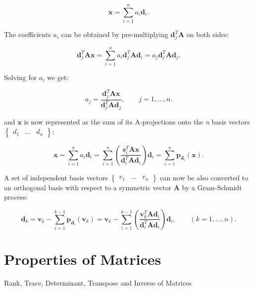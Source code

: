 \documentclass[10pt,b5paper,titlepage]{book}
\begin{document}
\begin{equation}
    \mathbf{x} = \sum_{i=1}^{n} a_{i}\mathbf{d}_{i}
.\end{equation}

The coefficients $a_{i}$ can be obtained by pre-multiplying $\mathbf{d}_{j}^{T}\mathbf{A}$
on both sides:

\begin{equation}
    \mathbf{d}_{j}^{T}\mathbf{A}\mathbf{x}
    = \sum_{i=1}^{n} a_{i}\mathbf{d}_{j}^{T}\mathbf{A}\mathbf{d}_{i}
    = a_{j}\mathbf{d}_{j}^{T}\mathbf{A}\mathbf{d}_{j}
.\end{equation}

Solving for $a_{i}$ we get:

\begin{equation}
    a_{j} = \frac{\mathbf{d}_{j}^{T}\mathbf{A}\mathbf{x}}{\mathbf{d}_{j}^{T}\mathbf{A}\mathbf{d}_{j}}
    ,\qquad j = 1,\ldots,n
.\end{equation}

and $\mathbf{x}$ is now represented as the sum of its A-projections onto the
\textit{n} basis vectors $\begin{Bmatrix} d_1 & \ldots & d_n \end{Bmatrix}$:

\begin{equation}
    \mathbf{x}
    = \sum_{i=1}^{n} a_{i}\mathbf{d}_{i}
    = \sum_{i=1}^{n} \left(
    \frac{\mathbf{s}_{i}^{T}\mathbf{A}\mathbf{x}}{\mathbf{d}_{i}^{T}\mathbf{A}\mathbf{d}_{i}}
    \right) \mathbf{d}_{i}
    = \sum_{i=1}^{n} \mathbf{p}_{\mathbf{d}_{i}}(\mathbf{x})
.\end{equation}

A set of independent basis vectors $\begin{Bmatrix} v_1 & \ldots & v_n \end{Bmatrix}$
can now be also converted to an orthogonal basis with respect to a symmetric
vector $\mathbf{A}$ by a Gram-Schmidt process:

\begin{equation}
    \mathbf{d}_{k} = \mathbf{v}_{k}
    - \sum_{i=1}^{k-1} \mathbf{p}_{\mathbf{d}_{i}}(\mathbf{v}_{k})
    = \mathbf{v}_{k}
    - \sum_{i=1}^{k-1} \left(
    \frac{\mathbf{v}_{k}^{T}\mathbf{A}\mathbf{d}_{i}}
    {\mathbf{d}_{i}^{T}\mathbf{A}\mathbf{d}_{i}} \right) \mathbf{d}_{i}
    , \qquad (k = 1, \ldots, n)
.\end{equation}


\chapter{Properties of Matrices}
Rank, Trace, Determinant, Transpose and Inverse of Matrices
\end{document}
